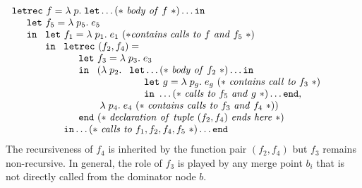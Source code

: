 \begin{equation}
\label{FuntionalCascadeFunLambda}
\begin{array}{l}
  \mathtt{letrec}\ f = \lambda\; p.\;
  \mathtt{let} \ldots (*\ \mathit{body\ of}\ f\ *)\ldots \mathtt{in}\\
  \quad \begin{array}{l}
          \mathtt{let}\ f_5 = \lambda\; p_5.\; e_5\\ \mathtt{in}\  
          \begin{array}[t]{l}
            \mathtt{let}\ f_1 = \lambda\;  p_1.\; e_1\ 
                 (* \mathit{contains\ calls\ to}\ f\ \mathit{and}\ f_5\ *) \\
            \mathtt{in}\ 
            \begin{array}[t]{l}
               \mathtt{letrec}\ (f_2, f_4) =\\ 
               \quad 
                 \begin{array}{l}
                   \mathtt{let}\ f_3 = \lambda\; p_3.\; e_3\\ \mathtt{in}\ 
                   \begin{array}[t]{l}
                   (\lambda\; p_2.\; 
                       \begin{array}[t]{l}
                         \mathtt{let} \ldots 
                            (*\ \mathit{body\ of}\ f_2\ *)\ldots
                         \mathtt{in}\\
                         \quad \begin{array}{l}
                           \mathtt{let}\ g = \lambda\; p_g.\; e_g\
                              (*\ \mathit{contains\ call\ to}\ f_3\ *)\\ 
                           \mathtt{in}\   \ldots 
                                 (*\ \mathit{calls\ to}\ f_5\ 
                                     \mathit{and}\ g\ *)
                           \ldots \mathtt{end},
                         \end{array}
                       \end{array}\\
                    \; \lambda\; p_4.\; e_4\
                       (*\ \mathit{contains\ calls\ to}\ f_3\ 
                           \mathit{and}\ f_4\ *))
                  \end{array}\\
               \mathtt{end}\ (*\ \mathit{declaration\ of\ tuple}\ (f_2,f_4)\
                                 \mathit{ends\ here}\ *) 
            \end{array}\\
            \mathtt{in} \ldots 
               (*\ \mathit{calls\ to}\ f_1, f_2, f_4, f_5\ *)
                 \ldots \mathtt{end}
            \end{array}
          \end{array}
        \end{array}
  \end{array}
\end{equation}
The recursiveness of $f_4$ is inherited by the function pair
$(f_2,f_4)$ but $f_3$ remains non-recursive. In general, the role of
$f_3$ is played by any merge point $b_i$ that is not directly called
from the dominator node $b$.

